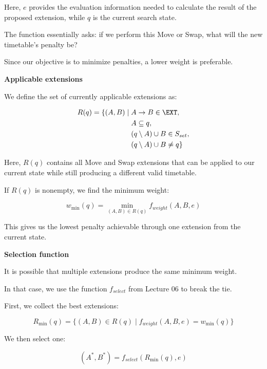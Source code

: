 Here, $e$ provides the evaluation information needed to calculate the result of the proposed extension, while $q$ is the current search state.

The function essentially asks: if we perform this Move or Swap, what will the new timetable's penalty be?

Since our objective is to minimize penalties, a lower weight is preferable.

\textbf{Applicable extensions}

We define the set of currently applicable extensions as:

\begin{equation}
    \begin{aligned}
    R(q)=\{(A,B)\mid\;&
    A\rightarrow B\in\EXT,\\
    &A\subseteq q,\\
    &(q\setminus A)\cup B\in S_{set},\\
    &(q\setminus A)\cup B\neq q\}
    \end{aligned}
\end{equation}

Here, $R(q)$ contains all Move and Swap extensions that can be applied to our current state while still producing a different valid timetable.

If $R(q)$ is nonempty, we find the minimum weight:

\begin{equation}
    w_{\min}(q)=
    \min_{(A,B)\in R(q)}
    f_{weight}(A,B,e)
\end{equation}

This gives us the lowest penalty achievable through one extension from the current state.

\textbf{Selection function}

It is possible that multiple extensions produce the same minimum weight.

In that case, we use the function $f_{select}$ from Lecture 06 to break the tie.

First, we collect the best extensions:

\begin{equation}
    R_{\min}(q)=
    \{(A,B)\in R(q)\mid
    f_{weight}(A,B,e)=w_{\min}(q)\}
\end{equation}

We then select one:

\begin{equation}
    (A^*,B^*)=
    f_{select}(R_{\min}(q),e)
\end{equation}


